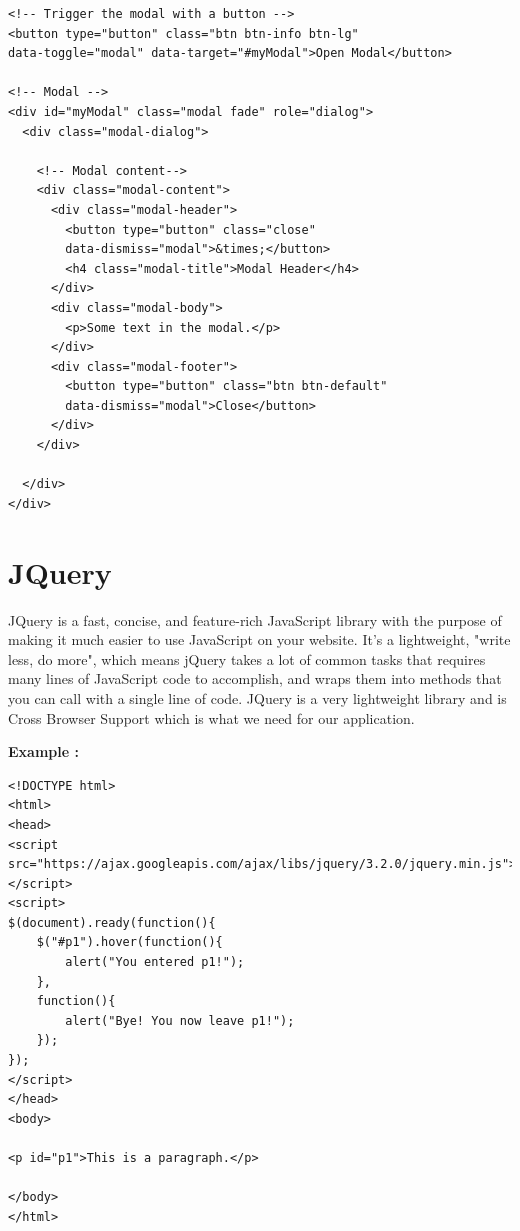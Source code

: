 \begin{verbatim}
<!-- Trigger the modal with a button -->
<button type="button" class="btn btn-info btn-lg" 
data-toggle="modal" data-target="#myModal">Open Modal</button>

<!-- Modal -->
<div id="myModal" class="modal fade" role="dialog">
  <div class="modal-dialog">

    <!-- Modal content-->
    <div class="modal-content">
      <div class="modal-header">
        <button type="button" class="close" 
        data-dismiss="modal">&times;</button>
        <h4 class="modal-title">Modal Header</h4>
      </div>
      <div class="modal-body">
        <p>Some text in the modal.</p>
      </div>
      <div class="modal-footer">
        <button type="button" class="btn btn-default"
        data-dismiss="modal">Close</button>
      </div>
    </div>

  </div>
</div>

\end{verbatim}

\section{JQuery}
JQuery is a fast, concise, and feature-rich JavaScript library with the purpose of making it much easier to use JavaScript on your website. It's a lightweight, "write less, do more", which means jQuery takes a lot of common tasks that requires many lines of JavaScript code to accomplish, and wraps them into methods that you can call with a single line of code\cite{JQueryOverview}. JQuery is a very lightweight library and is Cross Browser Support which is what we need for our application.

\textbf{Example :}\cite{JQueryExamples}
\begin{verbatim}
<!DOCTYPE html>
<html>
<head>
<script 
src="https://ajax.googleapis.com/ajax/libs/jquery/3.2.0/jquery.min.js">
</script>
<script>
$(document).ready(function(){
    $("#p1").hover(function(){
        alert("You entered p1!");
    },
    function(){
        alert("Bye! You now leave p1!");
    }); 
});
</script>
</head>
<body>

<p id="p1">This is a paragraph.</p>

</body>
</html>
\end{verbatim}

